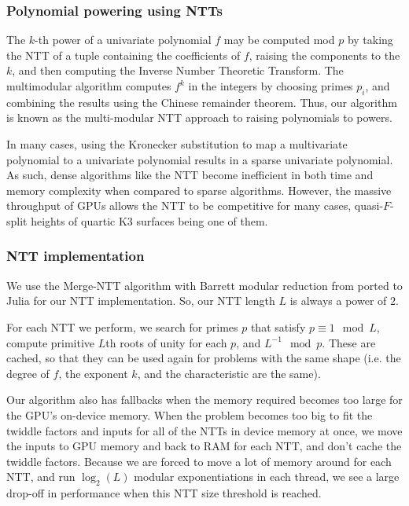 \documentclass[a4paper]{article}
\theoremstyle{definition}
\theoremstyle{remark}
\begin{document}
\subsubsection{Polynomial powering using NTTs}
The \(k\)-th power of a univariate polynomial \(f\)
may be computed mod \(p\) by taking the NTT 
of a tuple containing the coefficients of \(f\),
raising the components to the \(k\),
and then computing the Inverse Number Theoretic Transform.
The multimodular algorithm 
computes \(f^{k}\) in the integers by
choosing primes \(p_{i}\), 
and combining the results using the Chinese remainder theorem.
Thus, our algorithm is known as the 
multi-modular NTT approach to raising polynomials to powers.

In many cases, using the Kronecker substitution to 
map a multivariate polynomial to a univariate polynomial results in 
a sparse univariate polynomial. As such, dense 
algorithms like the NTT become inefficient in both 
time and memory complexity when compared to sparse algorithms.
However, the massive throughput of GPUs allows the 
NTT to be competitive for many cases, 
quasi-\(F\)-split heights of quartic K3 surfaces being 
one of them.

\subsubsection{NTT implementation}

We use the Merge-NTT algorithm with Barrett modular 
reduction from \cite{ozcan-2023-fft} 
ported to Julia for our NTT implementation. 
So, our NTT length $L$ is always a power of $2$. 

For each NTT we perform, we search for primes $p$ that satisfy 
$p \equiv 1 \mod L$, compute primitive $L$th roots of unity 
for each $p$, and $L^{-1} \mod p$. 
These are cached, so that they can be used again for problems with the same shape 
(i.e. the degree of \(f\), the exponent \(k\), and the characteristic are the same).

Our algorithm also has fallbacks when the memory required becomes too large for the 
GPU's on-device memory.
When the problem becomes too big to fit the twiddle factors and 
inputs for all of the NTTs in device memory at once, 
we move the inputs to GPU memory and 
back to RAM for each NTT, and don't cache the twiddle factors. 
Because we are forced to move a lot of memory around for each NTT, 
and run $\log_2(L)$ modular exponentiations in each thread,
we see a large drop-off in 
performance when this NTT size threshold is reached. 
\end{document}
